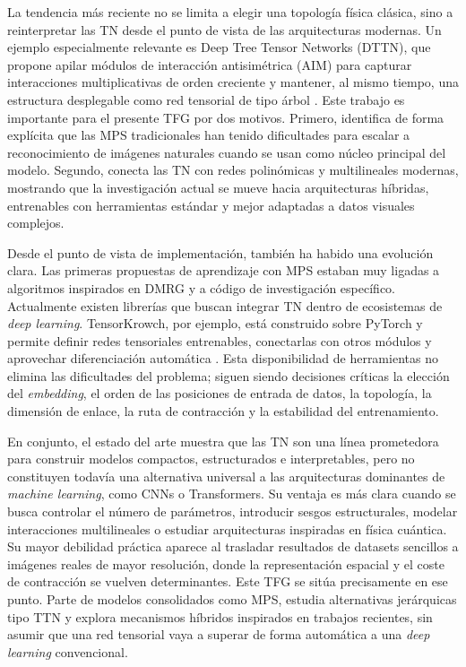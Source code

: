 La tendencia más reciente no se limita a elegir una topología física clásica, sino a reinterpretar las TN desde el punto de vista de las arquitecturas modernas. Un ejemplo especialmente relevante es Deep Tree Tensor Networks (DTTN), que propone apilar módulos de interacción antisimétrica (AIM) para capturar interacciones multiplicativas de orden creciente y mantener, al mismo tiempo, una estructura desplegable como red tensorial de tipo árbol . Este trabajo es importante para el presente TFG por dos motivos. Primero, identifica de forma explícita que las MPS tradicionales han tenido dificultades para escalar a reconocimiento de imágenes naturales cuando se usan como núcleo principal del modelo. Segundo, conecta las TN con redes polinómicas y multilineales modernas, mostrando que la investigación actual se mueve hacia arquitecturas híbridas, entrenables con herramientas estándar y mejor adaptadas a datos visuales complejos.

Desde el punto de vista de implementación, también ha habido una evolución clara. Las primeras propuestas de aprendizaje con MPS estaban muy ligadas a algoritmos inspirados en DMRG y a código de investigación específico. Actualmente existen librerías que buscan integrar TN dentro de ecosistemas de \textit{deep learning}. TensorKrowch, por ejemplo, está construido sobre PyTorch y permite definir redes tensoriales entrenables, conectarlas con otros módulos y aprovechar diferenciación automática . Esta disponibilidad de herramientas no elimina las dificultades del problema; siguen siendo decisiones críticas la elección del \textit{embedding}, el orden de las posiciones de entrada de datos, la topología, la dimensión de enlace, la ruta de contracción y la estabilidad del entrenamiento.

En conjunto, el estado del arte muestra que las TN son una línea prometedora para construir modelos compactos, estructurados e interpretables, pero no constituyen todavía una alternativa universal a las arquitecturas dominantes de \textit{machine learning}, como CNNs o Transformers. Su ventaja es más clara cuando se busca controlar el número de parámetros, introducir sesgos estructurales, modelar interacciones multilineales o estudiar arquitecturas inspiradas en física cuántica. Su mayor debilidad práctica aparece al trasladar resultados de datasets sencillos a imágenes reales de mayor resolución, donde la representación espacial y el coste de contracción se vuelven determinantes. Este TFG se sitúa precisamente en ese punto. Parte de modelos consolidados como MPS, estudia alternativas jerárquicas tipo TTN y explora mecanismos híbridos inspirados en trabajos recientes, sin asumir que una red tensorial vaya a superar de forma automática a una \textit{deep learning} convencional.

